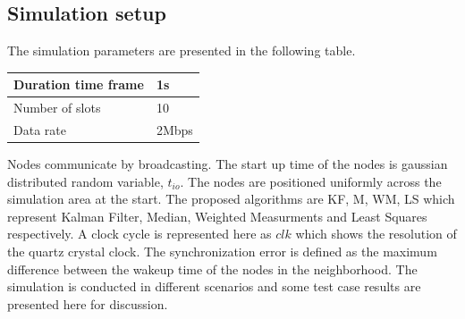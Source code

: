 \documentclass[journal]{IEEEtran}
\begin{document}
\subsection{\textbf{Simulation setup}}
The simulation parameters are presented in the following table.
\begin{center}
    \begin{tabular}{ | l | l |}
    \hline
    Duration time frame & 1s \\ \hline
    Number of slots &  10 \\ \hline
    Data rate &  2Mbps \\ \hline
    \end{tabular}
\end{center}
Nodes communicate by broadcasting. The start up time of the nodes is
gaussian distributed random variable, $t_{io}$. The nodes are
positioned uniformly across the simulation area at the start. The
proposed algorithms are KF, M, WM, LS which represent Kalman Filter,
Median, Weighted Measurments and Least Squares respectively. A clock
cycle is represented here as $clk$ which shows the resolution of the
quartz crystal clock. The synchronization error is defined as the
maximum difference between the wakeup time of the nodes in the
neighborhood. The simulation is conducted in different scenarios and
some test case results are presented here for discussion.
\end{document}
